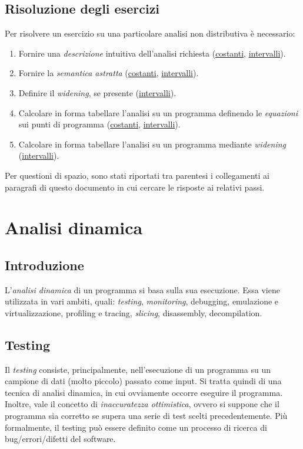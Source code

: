 \documentclass[a4paper,oneside,titlepage]{book}
\begin{document}
\section{Risoluzione degli esercizi}
Per risolvere un esercizio su una particolare analisi non distributiva è necessario:
\begin{enumerate}
    \item Fornire una \textit{descrizione} intuitiva dell'analisi richiesta (\hyperref[const1]{costanti}, \hyperref[int1]{intervalli}).
    \item Fornire la \textit{semantica astratta} (\hyperref[const2]{costanti}, \hyperref[int2]{intervalli}).
    \item Definire il \textit{widening}, se presente (\hyperref[int3]{intervalli}).
    \item Calcolare in forma tabellare l'analisi su un programma definendo le \textit{equazioni} sui punti di programma (\hyperref[const4]{costanti}, \hyperref[int4]{intervalli}).
    \item Calcolare in forma tabellare l'analisi su un programma mediante \textit{widening} (\hyperref[int5]{intervalli}).
\end{enumerate}
Per questioni di spazio, sono stati riportati tra parentesi i collegamenti ai paragrafi di questo documento in cui cercare le risposte ai relativi passi.


\chapter{Analisi dinamica}

\section{Introduzione} %
L'\textit{analisi dinamica} di un programma si basa sulla sua esecuzione. Essa viene utilizzata in vari ambiti, quali: \textit{testing}, \textit{monitoring}, debugging, emulazione e virtualizzazione, profiling e tracing, \textit{slicing}, disassembly, decompilation.

\section{Testing}
Il \textit{testing} consiste, principalmente, nell'esecuzione di un programma su un campione di dati (molto piccolo) passato come input. Si tratta quindi di una tecnica di analisi dinamica, in cui ovviamente occorre eseguire il programma. Inoltre, vale il concetto di \textit{inaccuratezza ottimistica}, ovvero si suppone che il programma sia corretto se supera una serie di test scelti precedentemente. Più formalmente, il testing può essere definito come un processo di ricerca di bug/errori/difetti del software.
\end{document}

